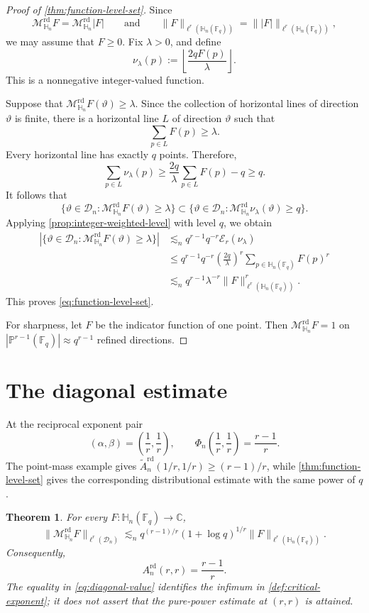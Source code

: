 \documentclass[11pt,letterpaper]{amsart}
\numberwithin{equation}{section}
\newtheorem{theorem}{Theorem}[section]
\theoremstyle{definition}
\theoremstyle{remark}
\newcommand{\Fq}{\mathbb F_q}
\newcommand{\C}{\mathbb C}
\newcommand{\PP}{\mathbb P}
\newcommand{\HH}{\mathbb H}
\newcommand{\Dn}{\mathcal D_n}
\newcommand{\Mrd}{\mathcal M^{\mathrm{rd}}_{\HH_n}}
\newcommand{\norm}[1]{\lVert #1\rVert}
\begin{document}
\begin{proof}[Proof of \cref{thm:function-level-set}]
Since
\[
 \Mrd F=\Mrd|F|
 \qquad\text{and}\qquad
 \norm{F}_{\ell^r(\HH_n(\Fq))}
 =
 \norm{|F|}_{\ell^r(\HH_n(\Fq))},
\]
we may assume that $F\geq0$.  Fix $\lambda>0$, and define
\[
 \nu_\lambda(p)
 :=
 \left\lfloor\frac{2qF(p)}{\lambda}\right\rfloor.
\]
This is a nonnegative integer-valued function.

Suppose that $\Mrd F(\vartheta)\geq\lambda$. Since the collection of horizontal lines of direction $\vartheta$ is finite, there is a horizontal line $L$ of direction $\vartheta$ such that
\[
 \sum_{p\in L}F(p)\geq\lambda.
\]
Every horizontal line has exactly $q$ points. Therefore,
\[
 \sum_{p\in L}\nu_\lambda(p)
 \geq
 \frac{2q}{\lambda}\sum_{p\in L}F(p)-q
 \geq q.
\]
It follows that
\[
 \{\vartheta\in\Dn:\Mrd F(\vartheta)\geq\lambda\}
 \subset
 \{\vartheta\in\Dn:\Mrd \nu_\lambda(\vartheta)\geq q\}.
\]
Applying \cref{prop:integer-weighted-level} with level $q$, we obtain
\begin{align*}
 \left|\{\vartheta\in\Dn:\Mrd F(\vartheta)\geq\lambda\}\right|
 &\lesssim_n
 q^{r-1}q^{-r}\mathcal E_r(\nu_\lambda)\\
 &\leq
 q^{r-1}q^{-r}
 \left(\frac{2q}{\lambda}\right)^r
 \sum_{p\in\HH_n(\Fq)}F(p)^r\\
 &\lesssim_n
 q^{r-1}\lambda^{-r}
 \norm{F}_{\ell^r(\HH_n(\Fq))}^r.
\end{align*}
This proves \eqref{eq:function-level-set}.

For sharpness, let $F$ be the indicator function of one point. Then $\Mrd F=1$ on $|\PP^{r-1}(\Fq)|\approx q^{r-1}$ refined directions.
\end{proof}



\section{The diagonal estimate}
\label{sec:diagonal}

At the reciprocal exponent pair
\begin{equation}\label{eq:diagonal-point}
 (\alpha,\beta)=\left(\frac1r,\frac1r\right),
 \qquad
 \Phi_n\left(\frac1r,\frac1r\right)=\frac{r-1}{r}.
\end{equation}
The point-mass example gives $\widetilde A_n^{\mathrm{rd}}(1/r,1/r)\geq(r-1)/r$, while \cref{thm:function-level-set} gives the corresponding distributional estimate with the same power of $q$.
\begin{theorem}
\label{thm:diagonal-estimate}
For every $F:\HH_n(\Fq)\to\C$,
\begin{equation}\label{eq:diagonal-estimate}
 \norm{\Mrd F}_{\ell^r(\Dn)}
 \lesssim_n
 q^{(r-1)/r}(1+\log q)^{1/r}
 \norm{F}_{\ell^r(\HH_n(\Fq))}.
\end{equation}
Consequently,
\begin{equation}\label{eq:diagonal-value}
 A_n^{\mathrm{rd}}(r,r)=\frac{r-1}{r}.
\end{equation}
The equality in \eqref{eq:diagonal-value} identifies the
infimum in \cref{def:critical-exponent}; it does not assert that the pure-power estimate at $(r,r)$ is attained.
\end{theorem}
\end{document}
